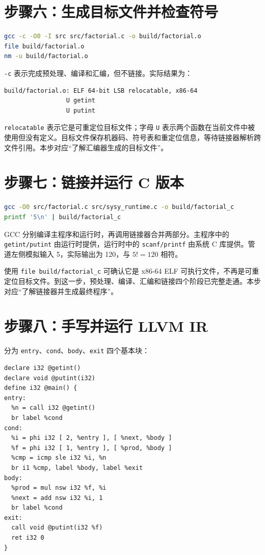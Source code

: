 \documentclass[UTF8,a4paper,12pt]{ctexart}
\begin{document}
\section{步骤六：生成目标文件并检查符号}

\begin{lstlisting}[language=bash]
gcc -c -O0 -I src src/factorial.c -o build/factorial.o
file build/factorial.o
nm -u build/factorial.o
\end{lstlisting}

\texttt{-c} 表示完成预处理、编译和汇编，但不链接。实际结果为：

\begin{lstlisting}
build/factorial.o: ELF 64-bit LSB relocatable, x86-64
                 U getint
                 U putint
\end{lstlisting}

\texttt{relocatable} 表示它是可重定位目标文件；字母 \texttt{U} 表示两个函数在当前文件中被使用但没有定义。目标文件保存机器码、符号表和重定位信息，等待链接器解析跨文件引用。本步对应“了解汇编器生成的目标文件”。

\section{步骤七：链接并运行 C 版本}

\begin{lstlisting}[language=bash]
gcc -O0 src/factorial.c src/sysy_runtime.c -o build/factorial_c
printf '5\n' | build/factorial_c
\end{lstlisting}

GCC 分别编译主程序和运行时，再调用链接器合并两部分。主程序中的 \texttt{getint/putint} 由运行时提供，运行时中的 \texttt{scanf/printf} 由系统 C 库提供。管道左侧模拟输入 5，实际输出为 120，与 $5!=120$ 相符。

使用 \texttt{file build/factorial\_c} 可确认它是 x86-64 ELF 可执行文件，不再是可重定位目标文件。到这一步，预处理、编译、汇编和链接四个阶段已完整走通。本步对应“了解链接器并生成最终程序”。

\section{步骤八：手写并运行 LLVM IR}

 分为 \texttt{entry}、\texttt{cond}、\texttt{body}、\texttt{exit} 四个基本块：

\begin{lstlisting}
declare i32 @getint()
declare void @putint(i32)
define i32 @main() {
entry:
  %n = call i32 @getint()
  br label %cond
cond:
  %i = phi i32 [ 2, %entry ], [ %next, %body ]
  %f = phi i32 [ 1, %entry ], [ %prod, %body ]
  %cmp = icmp sle i32 %i, %n
  br i1 %cmp, label %body, label %exit
body:
  %prod = mul nsw i32 %f, %i
  %next = add nsw i32 %i, 1
  br label %cond
exit:
  call void @putint(i32 %f)
  ret i32 0
}
\end{lstlisting}
\end{document}
